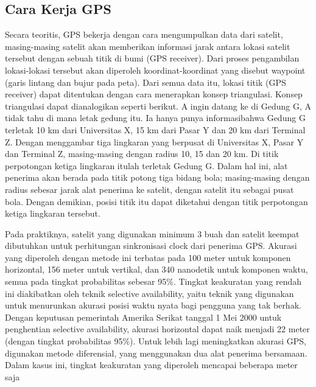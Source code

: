 \subsection{Cara Kerja GPS }
Secara teoritis, GPS bekerja dengan cara mengumpulkan data dari satelit, masing-masing satelit akan memberikan informasi jarak antara lokasi satelit tersebut dengan sebuah titik di bumi (GPS receiver). Dari proses pengambilan lokasi-lokasi tersebut akan diperoleh koordinat-koordinat yang disebut waypoint (garis lintang dan bujur pada peta). Dari semua data itu, lokasi titik (GPS receiver) dapat ditentukan dengan cara menerapkan konsep triangulasi. Konsep triangulasi dapat dianalogikan seperti berikut. A ingin datang ke di Gedung G, A tidak tahu di mana letak gedung itu. Ia hanya punya informasibahwa Gedung G terletak 10 km dari Universitas X, 15 km dari Pasar Y dan 20 km dari Terminal Z. Dengan menggambar tiga lingkaran yang berpusat di Universitas X, Pasar Y dan Terminal Z, masing-masing dengan radius 10, 15 dan 20 km. Di titik perpotongan ketiga lingkaran itulah terletak Gedung G. Dalam hal ini, alat penerima akan berada pada titik potong tiga bidang bola; masing-masing dengan radius sebesar jarak alat penerima ke satelit, dengan satelit itu sebagai pusat bola. Dengan demikian, posisi titik itu dapat diketahui dengan titik perpotongan ketiga lingkaran tersebut.

Pada praktiknya, satelit yang digunakan minimum 3 buah dan satelit keempat dibutuhkan untuk perhitungan sinkronisasi clock dari penerima GPS. Akurasi yang diperoleh dengan metode ini terbatas pada 100 meter untuk komponen horizontal, 156 meter untuk vertikal, dan 340 nanodetik untuk komponen waktu, semua pada tingkat probabilitas sebesar 95\%. Tingkat keakuratan yang rendah ini diakibatkan oleh teknik selective availability, yaitu teknik yang digunakan untuk menurunkan akurasi posisi waktu nyata bagi pengguna yang tak berhak. Dengan keputusan pemerintah Amerika Serikat tanggal 1 Mei 2000 untuk penghentian selective availability, akurasi horizontal dapat naik menjadi 22 meter (dengan tingkat probabilitas 95\%). Untuk lebih lagi meningkatkan akurasi GPS, digunakan metode diferensial, yang menggunakan dua alat penerima bersamaan. Dalam kasus ini, tingkat keakuratan yang diperoleh mencapai beberapa meter saja

